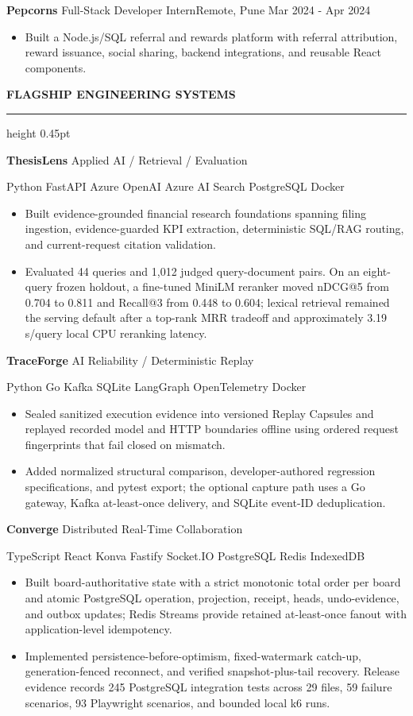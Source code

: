 \documentclass[10pt,a4paper]{article}
\newcommand{\resumesection}[1]{%
  \vspace{4.2pt}%
  {\color{accent}\fontsize{11.2pt}{12pt}\selectfont\bfseries\MakeUppercase{#1}}%
  \vspace{1.4pt}\par%
  {\color{rule}\hrule height 0.45pt}%
  \vspace{2.8pt}%
}
\newcommand{\entryline}[4]{%
  \textbf{#1} \textbar{} #2\hfill{\color{secondary}#3 \textbar{} #4}\par%
}
\newcommand{\projectline}[2]{%
  \textbf{#1} \textbar{} #2\par%
}
\newcommand{\techline}[1]{%
  {\color{secondary}\fontsize{8.9pt}{10.2pt}\selectfont #1}\par%
}
\newenvironment{resumeitems}{%
  \begin{itemize}[
    leftmargin=12pt,
    labelsep=4.2pt,
    itemsep=0.8pt,
    parsep=0pt,
    topsep=1.2pt,
    partopsep=0pt
  ]%
}{%
  \end{itemize}%
}
\begin{document}
\entryline{Pepcorns}{Full-Stack Developer Intern}{Remote, Pune}{Mar 2024 - Apr 2024}
\begin{resumeitems}
  \item Built a Node.js/SQL referral and rewards platform with referral attribution, reward issuance, social sharing, backend integrations, and reusable React components.
\end{resumeitems}

\resumesection{Flagship Engineering Systems}
\projectline{ThesisLens}{Applied AI / Retrieval / Evaluation}
\techline{Python \textbar{} FastAPI \textbar{} Azure OpenAI \textbar{} Azure AI Search \textbar{} PostgreSQL \textbar{} Docker}
\begin{resumeitems}
  \item Built evidence-grounded financial research foundations spanning filing ingestion, evidence-guarded KPI extraction, deterministic SQL/RAG routing, and current-request citation validation.
  \item Evaluated 44 queries and 1,012 judged query-document pairs. On an eight-query frozen holdout, a fine-tuned MiniLM reranker moved nDCG@5 from 0.704 to 0.811 and Recall@3 from 0.448 to 0.604; lexical retrieval remained the serving default after a top-rank MRR tradeoff and approximately 3.19 s/query local CPU reranking latency.
\end{resumeitems}

\projectline{TraceForge}{AI Reliability / Deterministic Replay}
\techline{Python \textbar{} Go \textbar{} Kafka \textbar{} SQLite \textbar{} LangGraph \textbar{} OpenTelemetry \textbar{} Docker}
\begin{resumeitems}
  \item Sealed sanitized execution evidence into versioned Replay Capsules and replayed recorded model and HTTP boundaries offline using ordered request fingerprints that fail closed on mismatch.
  \item Added normalized structural comparison, developer-authored regression specifications, and pytest export; the optional capture path uses a Go gateway, Kafka at-least-once delivery, and SQLite event-ID deduplication.
\end{resumeitems}

\projectline{Converge}{Distributed Real-Time Collaboration}
\techline{TypeScript \textbar{} React \textbar{} Konva \textbar{} Fastify \textbar{} Socket.IO \textbar{} PostgreSQL \textbar{} Redis \textbar{} IndexedDB}
\begin{resumeitems}
  \item Built board-authoritative state with a strict monotonic total order per board and atomic PostgreSQL operation, projection, receipt, heads, undo-evidence, and outbox updates; Redis Streams provide retained at-least-once fanout with application-level idempotency.
  \item Implemented persistence-before-optimism, fixed-watermark catch-up, generation-fenced reconnect, and verified snapshot-plus-tail recovery. Release evidence records 245 PostgreSQL integration tests across 29 files, 59 failure scenarios, 93 Playwright scenarios, and bounded local k6 runs.
\end{resumeitems}
\end{document}

